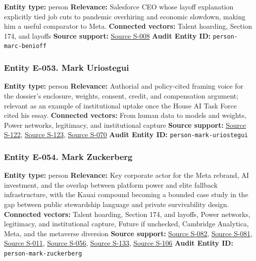 \documentclass[
  american,
  11pt,
  letterpaper,
]{article}
\begin{document}
\textbf{Entity type:} person \textbf{Relevance:} Salesforce CEO whose
layoff explanation explicitly tied job cuts to pandemic overhiring and
economic slowdown, making him a useful comparator to Meta.
\textbf{Connected vectors:} Talent hoarding, Section 174, and layoffs
\textbf{Source support:}
\hyperref[source-s-008-amazon-salesforce-jettison-jobs-in-latest-tech-worker-purge]{Source
S-008} \textbf{Audit Entity ID:} \texttt{person-marc-benioff}

\subsubsection{Entity E-053. Mark
Uriostegui}\label{entity-e-053-mark-uriostegui}

\textbf{Entity type:} person \textbf{Relevance:} Authorial and
policy-cited framing voice for the dossier's enclosure, weights,
consent, credit, and compensation argument; relevant as an example of
institutional uptake once the House AI Task Force cited his essay.
\textbf{Connected vectors:} From human data to models and weights, Power
networks, legitimacy, and institutional capture \textbf{Source support:}
\hyperref[source-s-122-ai-copyright-weights-a-new-frontier-in-intellectual-property-law]{Source
S-122},
\hyperref[source-s-123-how-ai-is-ruining-your-life-to-build-an-empire]{Source
S-123},
\hyperref[source-s-070-bipartisan-house-task-force-report-on-artificial-intelligence]{Source
S-070} \textbf{Audit Entity ID:} \texttt{person-mark-uriostegui}

\subsubsection{Entity E-054. Mark
Zuckerberg}\label{entity-e-054-mark-zuckerberg}

\textbf{Entity type:} person \textbf{Relevance:} Key corporate actor for
the Meta rebrand, AI investment, and the overlap between platform power
and elite fallback infrastructure, with the Kauai compound becoming a
bounded case study in the gap between public stewardship language and
private survivability design. \textbf{Connected vectors:} Talent
hoarding, Section 174, and layoffs, Power networks, legitimacy, and
institutional capture, Future if unchecked, Cambridge Analytica, Meta,
and the metaverse diversion \textbf{Source support:}
\hyperref[source-s-082-mark-zuckerberg-s-message-to-meta-employees]{Source
S-082}, \hyperref[source-s-081-the-facebook-company-is-now-meta]{Source
S-081},
\hyperref[source-s-011-meta-ceo-mark-zuckerberg-kicks-off-developer-conference-with-focus-on-ai-virtual-reality]{Source
S-011},
\hyperref[source-s-056-meta-sees-ai-spending-accelerating-as-earnings-top-forecasts]{Source
S-056},
\hyperref[source-s-133-inside-mark-zuckerbergs-top-secret-hawaii-compound]{Source
S-133},
\hyperref[source-s-106-mark-zuckerberg-downplays-his-5-000-square-foot-underground-bunker-in-hawaii-just-a-little-shelter]{Source
S-106} \textbf{Audit Entity ID:} \texttt{person-mark-zuckerberg}
\end{document}
